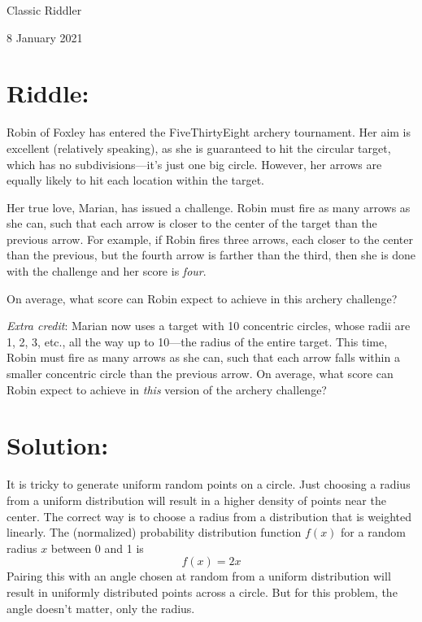 \documentclass{article}
\begin{document}
\pagestyle{empty} %

\begin{center}
{\LARGE Classic Riddler}

\vspace{0.15in}

{\Large 8 January 2021}
\end{center}


\section*{Riddle:}

Robin of Foxley has entered the FiveThirtyEight archery tournament.
Her aim is excellent (relatively speaking), as she is guaranteed to hit the circular target, which has no subdivisions---it’s just one big circle.
However, her arrows are equally likely to hit each location within the target.

Her true love, Marian, has issued a challenge.
Robin must fire as many arrows as she can, such that each arrow is closer to the center of the target than the previous arrow.
For example, if Robin fires three arrows, each closer to the center than the previous, but the fourth arrow is farther than the third, then she is done with the challenge and her score is \textit{four}.

On average, what score can Robin expect to achieve in this archery challenge?

\textit{Extra credit}: Marian now uses a target with 10 concentric circles, whose radii are 1, 2, 3, etc., all the way up to 10---the radius of the entire target.
This time, Robin must fire as many arrows as she can, such that each arrow falls within a smaller concentric circle than the previous arrow.
On average, what score can Robin expect to achieve in \textit{this} version of the archery challenge?


\section*{Solution:}

It is tricky to generate uniform random points on a circle.
Just choosing a radius from a uniform distribution will result in a higher density of points near the center.
The correct way is to choose a radius from a distribution that is weighted linearly.
The (normalized) probability distribution function $f(x)$ for a random radius $x$ between 0 and 1 is
\[
f(x)=2x
\]
Pairing this with an angle chosen at random from a uniform distribution will result in uniformly distributed points across a circle.
But for this problem, the angle doesn't matter, only the radius.
\end{document}
